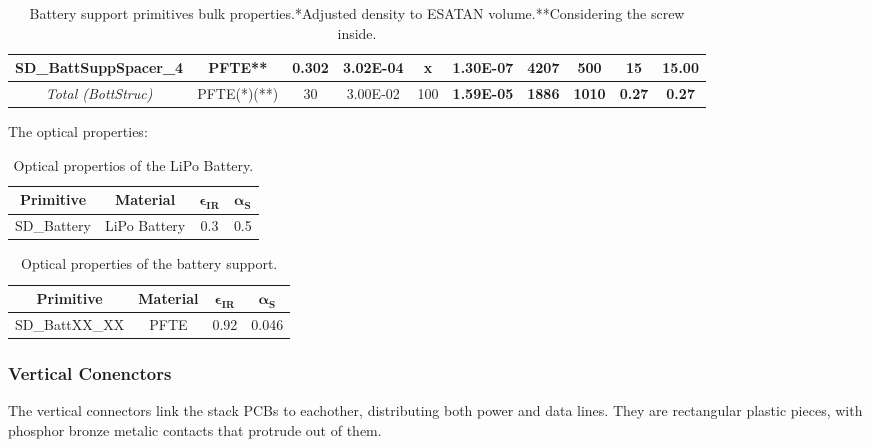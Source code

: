 \begin{table}[H]
{\begin{tabular}{@{}cccccccccc@{}}
  SD\_BattSuppSpacer\_4                  & PFTE**          & 0.302 & 3.02E-04 & x                & \textbf{1.30E-07}               & \textbf{4207}                     & \textbf{500}                          & \textbf{15}                               & \textbf{15.00}                            \\ \midrule
  \textit{Total (BottStruc)}             & PFTE(*)(**)           &   30                &  3.00E-02                 &  100                          & \textbf{1.59E-05}               & \textbf{1886}                     & \textbf{1010}                         & \textbf{0.27}                            & \textbf{0.27}                            \\ \bottomrule
  \end{tabular}
  }
  \caption{Battery support primitives bulk properties.*Adjusted density to ESATAN volume.**Considering the screw inside.}
\end{table}

The optical properties:

\begin{table}[H]
  \centering
  \begin{tabular}{@{}cccc@{}}
  \toprule
  \textbf{Primitive} & \textbf{Material} & $\mathbf{\epsilon_{IR}}$ & $\mathbf{\alpha_{S}}$ \\ \midrule
  SD\_Battery        & LiPo Battery      & 0.3                      & 0.5                   \\ \bottomrule
  \end{tabular}
  \caption{Optical propertios of the LiPo Battery.}
\end{table}

\begin{table}[H]
  \centering
  \begin{tabular}{@{}cccc@{}}
  \toprule
  \textbf{Primitive} & \textbf{Material} & $\mathbf{\epsilon_{IR}}$ & $\mathbf{\alpha_{S}}$ \\ \midrule
  SD\_BattXX\_XX     & PFTE              & 0.92                     & 0.046                 \\ \bottomrule
  \end{tabular}
  \caption{Optical properties of the battery support.}
\end{table}



\subsubsection{Vertical Conenctors}
The vertical connectors link the stack PCBs to eachother, distributing both power and data lines.
They are rectangular plastic pieces, with phosphor bronze metalic contacts that protrude out of them.

